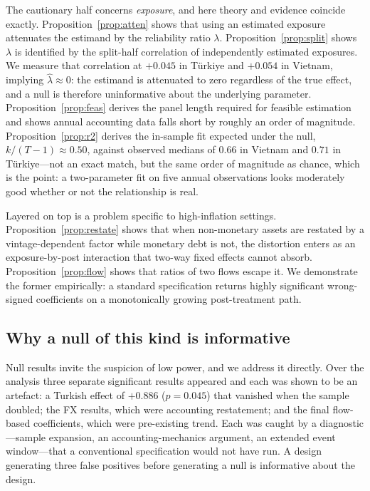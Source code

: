 \documentclass[review,12pt,authoryear]{elsarticle}
\theoremstyle{plain}
\theoremstyle{definition}
\begin{document}
The cautionary half concerns \emph{exposure}, and here theory and evidence
coincide exactly. Proposition~\ref{prop:atten} shows that using an estimated
exposure attenuates the estimand by the reliability ratio $\lambda$.
Proposition~\ref{prop:split} shows $\lambda$ is identified by the split-half
correlation of independently estimated exposures. We measure that correlation at
$+0.045$ in T\"{u}rkiye and $+0.054$ in Vietnam, implying
$\hat{\lambda}\approx 0$: the estimand is attenuated to zero regardless of the
true effect, and a null is therefore uninformative about the underlying
parameter. Proposition~\ref{prop:feas} derives the panel length required for
feasible estimation and shows annual accounting data falls short by roughly an
order of magnitude. Proposition~\ref{prop:r2} derives the in-sample fit expected
under the null, $k/(T-1)\approx0.50$, against observed medians of $0.66$ in
Vietnam and $0.71$ in T\"{u}rkiye---not an exact match, but the same order of
magnitude as chance, which is the point: a two-parameter fit on five annual
observations looks moderately good whether or not the relationship is real.

Layered on top is a problem specific to high-inflation settings.
Proposition~\ref{prop:restate} shows that when non-monetary assets are restated
by a vintage-dependent factor while monetary debt is not, the distortion enters
as an exposure-by-post interaction that two-way fixed effects cannot absorb.
Proposition~\ref{prop:flow} shows that ratios of two flows escape it. We
demonstrate the former empirically: a standard specification returns highly
significant wrong-signed coefficients on a monotonically growing post-treatment
path.

\subsection{Why a null of this kind is informative}

Null results invite the suspicion of low power, and we address it directly.
Over the analysis three separate significant results appeared and each was shown
to be an artefact: a Turkish effect of $+0.886$ ($p=0.045$) that vanished when
the sample doubled; the FX results, which were accounting restatement; and the
final flow-based coefficients, which were pre-existing trend. Each was caught by
a diagnostic---sample expansion, an accounting-mechanics argument, an extended
event window---that a conventional specification would not have run. A design
generating three false positives before generating a null is informative about
the design.
\end{document}
